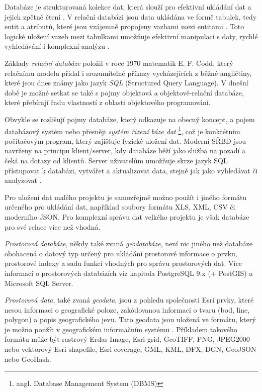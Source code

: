 Databáze je strukturovaná kolekce dat, která slouží pro efektivní ukládání dat a jejich zpětně čtení \citep{Oppel2009}. V relační databázi jsou data ukládána ve formě tabulek, tedy entit a atributů, které jsou vzájemně propojeny vazbami mezi entitami \citep{Connolly2005}. Toto logické uložení vazeb mezi tabulkami umožňuje efektivní manipulaci s daty, rychlé vyhledávání i komplexní analýzu \citep{Momjian2001}. 

Základy {\it relační databáze} položil v roce 1970 matematik E. F. Codd, který relačnímu modelu přidal i srozumitelné příkazy vycházejících z běžné angličtiny, které jsou dnes známy jako jazyk {\it SQL} (Structured Query Language)\citep{Zak2001}. V dnešní době je možné setkat se také s pojmy objektová a objektově-relační databáze, které přebírají řadu vlastností z oblasti objektového programování.

Obvykle se rozlišují pojmy databáze, který odkazuje na obecný koncept, a pojem databázový systém nebo přesněji {\it systém řízení báze dat} \footnote{angl. Database Management System (DBMS)}, což je konkrétním počítačovým program, který zajišťuje fyzické uložení dat. Moderní SŘBD jsou navrženy na principu klient/server, kdy databáze běží jako služba na pozadí a čeká na dotazy od klientů. Server uživatelům umožňuje skrze jazyk SQL přístupovat k databázi, vytvářet a aktualizovat data, stejně jak jako vyhledávat či analyzovat \citep{Connolly2005}.

Pro uložení dat malého projektu je samozřejmě možno použít i jiného formátu určeného pro ukládání dat, například soubory formátu XLS, XML, CSV či moderního JSON. Pro komplexní správu dat velkého projektu je však databáze pro své relace více než vhodná. 

{\it Prostorová databáze}, někdy také zvaná {\it geodatabáze}, není nic jiného než databáze obohacená o datový typ určený pro ukládání prostorové informace o prvku, prostorové indexy a sadu funkcí vhodných pro správu prostorových dat. Více informací o prostorových databázích viz kapitola  PostgreSQL 9.x (+ PostGIS) a  Microsoft SQL Server. 

{\it Prostorová data}, také zvaná {\it geodata}, jsou z pohledu společnosti Esri prvky, které nesou informaci o geografické poloze, zakódovanou informaci o tvaru (bod, line, polygon) a popis geografického jevu. Tato geodata jsou uložená ve formátu, který je možno použít v geografickém informačním systému \citep{Esri2006}. Příkladem takového formátu může být rastrový Erdas Image, Esri grid, GeoTIFF, PNG,  JPEG2000 nebo vektorový Esri shapefile, Esri coverage, GML, KML, DFX, DGN, GeoJSON nebo GeoHash. 

